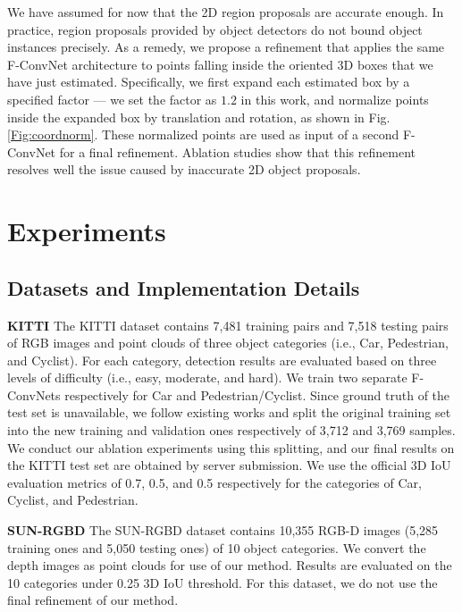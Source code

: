 \documentclass[letterpaper, 10 pt, conference]{ieeeconf}
\begin{document}
We have assumed for now that the 2D region proposals are accurate enough. In practice, region proposals provided by object detectors do not bound object instances precisely. As a remedy, we propose a refinement that applies the same F-ConvNet architecture to points falling inside the oriented 3D boxes that we have just estimated. Specifically, we first expand each estimated box by a specified factor --- we set the factor as $1.2$ in this work, and normalize points inside the expanded box by translation and rotation, as shown in Fig. \ref{Fig:coordnorm}. These normalized points are used as input of a second F-ConvNet for a final refinement. Ablation studies show that this refinement resolves well the issue caused by inaccurate 2D object proposals.

\section{Experiments}
\subsection{Datasets and Implementation Details}

\noindent\textbf{KITTI} The KITTI dataset \cite{geiger2012we} contains 7,481 training pairs and 7,518 testing pairs of RGB images and point clouds of three object categories (i.e., Car, Pedestrian, and Cyclist). For each category, detection results are evaluated based on three levels of difficulty (i.e., easy, moderate, and hard). We train two separate F-ConvNets respectively for Car and Pedestrian/Cyclist. Since ground truth of the test set is unavailable, we follow existing works \cite{chen2017multi} and split the original training set into the new training and validation ones respectively of 3,712 and 3,769 samples. We conduct our ablation experiments using this splitting, and our final results on the KITTI test set are obtained by server submission. We use the official 3D IoU evaluation metrics of 0.7, 0.5, and 0.5 respectively for the categories of Car, Cyclist, and Pedestrian.

\vspace{0.1cm}
\noindent\textbf{SUN-RGBD} The SUN-RGBD dataset \cite{song2015sun} contains 10,355 RGB-D images (5,285 training ones and 5,050 testing ones) of 10 object categories. We convert the depth images as point clouds for use of our method. Results are evaluated on the 10 categories under 0.25 3D IoU threshold. For this dataset, we do not use the final refinement of our method.
\end{document}
